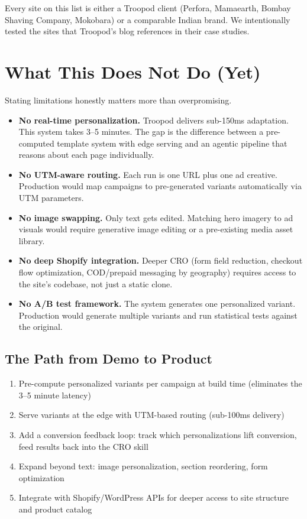 \documentclass{article}
\begin{document}
Every site on this list is either a Troopod client (Perfora, Mamaearth, Bombay Shaving Company, Mokobara) or a comparable Indian brand. We intentionally tested the sites that Troopod's blog references in their case studies.

\section{What This Does Not Do (Yet)}

Stating limitations honestly matters more than overpromising.

\begin{itemize}[leftmargin=2em]
    \item \textbf{No real-time personalization.} Troopod delivers sub-150ms adaptation. This system takes 3--5 minutes. The gap is the difference between a pre-computed template system with edge serving and an agentic pipeline that reasons about each page individually.
    \item \textbf{No UTM-aware routing.} Each run is one URL plus one ad creative. Production would map campaigns to pre-generated variants automatically via UTM parameters.
    \item \textbf{No image swapping.} Only text gets edited. Matching hero imagery to ad visuals would require generative image editing or a pre-existing media asset library.
    \item \textbf{No deep Shopify integration.} Deeper CRO (form field reduction, checkout flow optimization, COD/prepaid messaging by geography) requires access to the site's codebase, not just a static clone.
    \item \textbf{No A/B test framework.} The system generates one personalized variant. Production would generate multiple variants and run statistical tests against the original.
\end{itemize}

\subsection{The Path from Demo to Product}

\begin{enumerate}[leftmargin=2em]
    \item Pre-compute personalized variants per campaign at build time (eliminates the 3--5 minute latency)
    \item Serve variants at the edge with UTM-based routing (sub-100ms delivery)
    \item Add a conversion feedback loop: track which personalizations lift conversion, feed results back into the CRO skill
    \item Expand beyond text: image personalization, section reordering, form optimization
    \item Integrate with Shopify/WordPress APIs for deeper access to site structure and product catalog
\end{enumerate}
\end{document}
